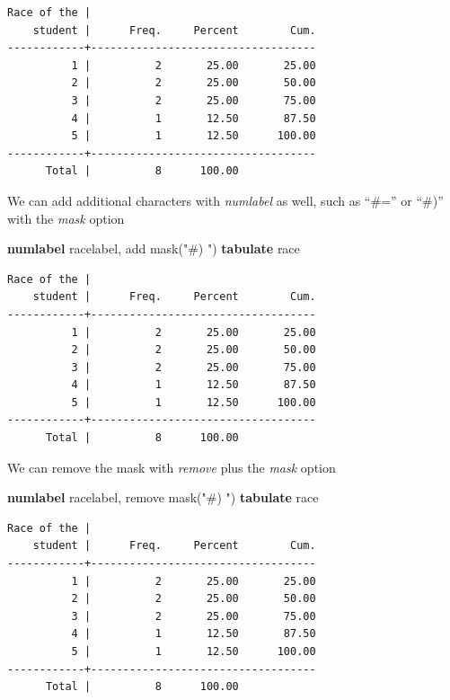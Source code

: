\documentclass[
]{book}
\newenvironment{Shaded}{\begin{snugshade}}{\end{snugshade}}
\newcommand{\KeywordTok}[1]{\textcolor[rgb]{0.13,0.29,0.53}{\textbf{#1}}}
\newcommand{\NormalTok}[1]{#1}
\newcommand{\StringTok}[1]{\textcolor[rgb]{0.31,0.60,0.02}{#1}}
\begin{document}
\begin{verbatim}
Race of the |
    student |      Freq.     Percent        Cum.
------------+-----------------------------------
          1 |          2       25.00       25.00
          2 |          2       25.00       50.00
          3 |          2       25.00       75.00
          4 |          1       12.50       87.50
          5 |          1       12.50      100.00
------------+-----------------------------------
      Total |          8      100.00
\end{verbatim}

We can add additional characters with \emph{numlabel} as well, such as ``\#='' or ``\#)'' with the \emph{mask} option

\begin{Shaded}
\begin{Highlighting}[]
\KeywordTok{numlabel}\NormalTok{ racelabel, add mask(}\StringTok{"\#) "}\NormalTok{)}
\KeywordTok{tabulate}\NormalTok{ race}
\end{Highlighting}
\end{Shaded}

\begin{verbatim}
Race of the |
    student |      Freq.     Percent        Cum.
------------+-----------------------------------
          1 |          2       25.00       25.00
          2 |          2       25.00       50.00
          3 |          2       25.00       75.00
          4 |          1       12.50       87.50
          5 |          1       12.50      100.00
------------+-----------------------------------
      Total |          8      100.00
\end{verbatim}

We can remove the mask with \emph{remove} plus the \emph{mask} option

\begin{Shaded}
\begin{Highlighting}[]
\KeywordTok{numlabel}\NormalTok{ racelabel, remove mask(}\StringTok{"\#) "}\NormalTok{)}
\KeywordTok{tabulate}\NormalTok{ race}
\end{Highlighting}
\end{Shaded}

\begin{verbatim}
Race of the |
    student |      Freq.     Percent        Cum.
------------+-----------------------------------
          1 |          2       25.00       25.00
          2 |          2       25.00       50.00
          3 |          2       25.00       75.00
          4 |          1       12.50       87.50
          5 |          1       12.50      100.00
------------+-----------------------------------
      Total |          8      100.00
\end{verbatim}
\end{document}
